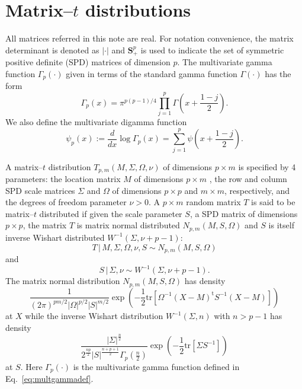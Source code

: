 \documentclass[english,listof=totoc]{scrartcl}
\begin{document}
\section{Matrix--$t$ distributions}\label{sec:matrixt}

All matrices referred in this note are real. For notation convenience, the matrix determinant is denoted as $|\cdot|$ and $\mathbf{S}_+^p$ is used to indicate the set of symmetric positive definite (SPD) matrices of dimension $p$. The multivariate gamma function $\Gamma_{p}(\cdot)$ given in terms of the standard gamma function $\Gamma(\cdot)$ has the form
\begin{equation}
\Gamma_{p}(x)=\pi^{p(p-1)/4}\prod_{j=1}^{p}\Gamma\left(x+\frac{1-j}{2}\right).\label{eq:multgammadef}
\end{equation}
We also define the multivariate digamma function
%
\begin{equation}
\psi_{p}(x):=\frac{d}{dx}\log\Gamma_{p}(x)=\sum_{j=1}^{p}\psi\left(x+\frac{1-j}{2}\right).
\end{equation}

A matrix--$t$ distribution $T_{p,m}(M,\Sigma,\Omega,\nu)$ of dimensions $p\times m$ is specified by 4 parameters: the location matrix $M$ of dimensions $p\times m$ , the row and column SPD scale matrices $\Sigma$ and $\Omega$ of dimensions $p\times p$ and $m\times m$, respectively, and the degrees of freedom parameter $\nu>0$. A $p \times m$ random matrix $T$ is said to be matrix--$t$ distributed if given the scale parameter $S$, a SPD matrix of dimensions $p\times p$, the matrix $T$ is matrix normal distributed $N_{p,m}(M,S,\Omega)$ and $S$ is itself inverse Wishart distributed $W^{-1}(\Sigma,\nu +p -1)$:
\begin{equation}
T\,|\,M,\Sigma,\Omega,\nu,S \sim N_{p,m}(M,S,\Omega)\label{eq:tdef1}
\end{equation}
and
\begin{equation}
S\,|\,\Sigma,\nu \sim W^{-1}(\Sigma,\nu+p-1).\label{eq:tdef2}
\end{equation}
The matrix normal distribution $N_{p,m}(M,S,\Omega)$ has density
\begin{equation}
\frac{1}{(2\pi)^{pm/2}|\Omega|^{p/2}|S|^{m/2}}\exp\left(-\frac{1}{2}\textrm{tr}\left[\Omega^{-1}(X-M)^{\textrm{t}}S^{-1}(X-M)\right]\right)\label{eq:ndistpdf}
\end{equation}
at $X$ while the inverse Wishart distribution $W^{-1}(\Sigma,n)$ with $n>p-1$ has density
\begin{equation}
\frac{|\Sigma|^{\frac{n}{2}}}{2^{\frac{n p}{2}}|S|^{\frac{n+p+1}{2}}\Gamma_{p}(\frac{n}{2})}\exp\left(-\frac{1}{2}\textrm{tr}\left[\Sigma S^{-1}\right]\right)\label{eq:wdistpdf}
\end{equation}
at $S$. Here $\Gamma_{p}(\cdot)$ is the
multivariate gamma function defined in Eq.~\eqref{eq:multgammadef}.
\end{document}
